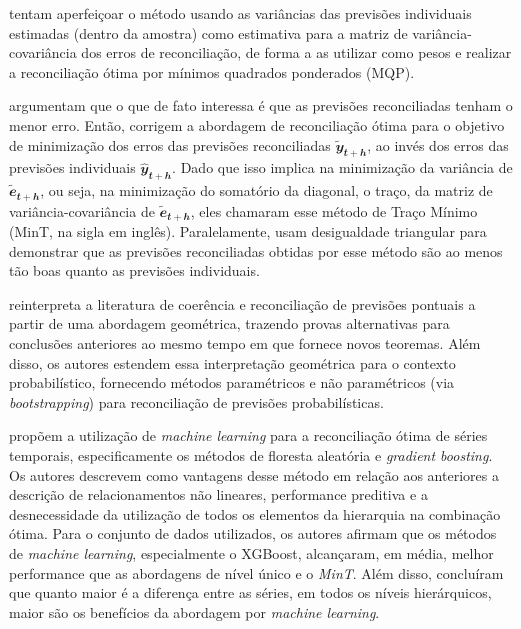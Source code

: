 \documentclass[
  12pt,
  twoside,
  openright,
  a4paper,
  chapter=TITLE,
  section=TITLE,
  brazil]{abntex2}
\begin{document}
\textcite{hyndman_fast_2016} tentam aperfeiçoar o método usando as
variâncias das previsões individuais estimadas (dentro da amostra) como
estimativa para a matriz de variância-covariância dos erros de
reconciliação, de forma a as utilizar como pesos e realizar a
reconciliação ótima por mínimos quadrados ponderados (MQP).

\textcite{wickramasuriya_optimal_2019} argumentam que o que de fato
interessa é que as previsões reconciliadas tenham o menor erro. Então,
corrigem a abordagem de reconciliação ótima para o objetivo de
minimização dos erros das previsões reconciliadas
\(\mathbfit{\tilde{y}_{t+h}}\), ao invés dos erros das previsões
individuais \(\mathbfit{\hat{y}_{t+h}}\). Dado que isso implica na
minimização da variância de \(\mathbfit{\tilde{e}_{t+h}}\), ou seja, na
minimização do somatório da diagonal, o traço, da matriz de
variância-covariância de \(\mathbfit{\tilde{e}_{t+h}}\), eles chamaram
esse método de Traço Mínimo (MinT, na sigla em inglês). Paralelamente,
usam desigualdade triangular para demonstrar que as previsões
reconciliadas obtidas por esse método são ao menos tão boas quanto as
previsões individuais.

\textcite{panagiotelis_forecast_2021} reinterpreta a literatura de
coerência e reconciliação de previsões pontuais a partir de uma
abordagem geométrica, trazendo provas alternativas para conclusões
anteriores ao mesmo tempo em que fornece novos teoremas. Além disso, os
autores estendem essa interpretação geométrica para o contexto
probabilístico, fornecendo métodos paramétricos e não paramétricos (via
\emph{bootstrapping}) para reconciliação de previsões probabilísticas.

\textcite{spiliotis_hierarchical_2021} propõem a utilização de
\emph{machine learning} para a reconciliação ótima de séries temporais,
especificamente os métodos de floresta aleatória e \emph{gradient
boosting}. Os autores descrevem como vantagens desse método em relação
aos anteriores a descrição de relacionamentos não lineares, performance
preditiva e a desnecessidade da utilização de todos os elementos da
hierarquia na combinação ótima. Para o conjunto de dados utilizados, os
autores afirmam que os métodos de \emph{machine learning}, especialmente
o XGBoost, alcançaram, em média, melhor performance que as abordagens de
nível único e o \emph{MinT}. Além disso, concluíram que quanto maior é a
diferença entre as séries, em todos os níveis hierárquicos, maior são os
benefícios da abordagem por \emph{machine learning}.
\end{document}
